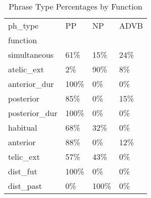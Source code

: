 \begin{table}[htbp!]
\centering
\caption{Phrase Type Percentages by Function}
\label{table:funcpt_pr}
\begin{tabular}{llll}
\toprule
ph\_type &    PP &    NP & ADVB \\
function      &       &       &      \\
\midrule
simultaneous  &   61\% &   15\% &  24\% \\
atelic\_ext    &    2\% &   90\% &   8\% \\
anterior\_dur  &  100\% &    0\% &   0\% \\
posterior     &   85\% &    0\% &  15\% \\
posterior\_dur &  100\% &    0\% &   0\% \\
habitual      &   68\% &   32\% &   0\% \\
anterior      &   88\% &    0\% &  12\% \\
telic\_ext     &   57\% &   43\% &   0\% \\
dist\_fut      &  100\% &    0\% &   0\% \\
dist\_past     &    0\% &  100\% &   0\% \\
\bottomrule
\end{tabular}
\end{table}
